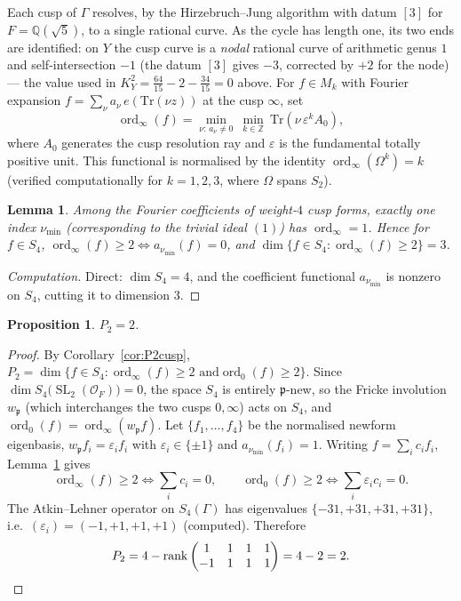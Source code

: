 \documentclass[11pt]{article}
\newtheorem{proposition}[theorem]{Proposition}
\newtheorem{lemma}[theorem]{Lemma}
\theoremstyle{definition}
\DeclareMathOperator{\ord}{ord}
\DeclareMathOperator{\rank}{rank}
\DeclareMathOperator{\SL}{SL}
\newcommand{\bQ}{\mathbb{Q}}
\newcommand{\bZ}{\mathbb{Z}}
\newcommand{\cO}{\mathcal{O}}
\newcommand{\fp}{\mathfrak{p}}
\newcommand{\Om}{\Omega}
\begin{document}
Each cusp of $\Gamma$ resolves, by the Hirzebruch--Jung algorithm with datum
$[3]$ for $F=\bQ(\sqrt5)$, to a single rational curve. As the cycle has length
one, its two ends are identified: on $Y$ the cusp curve is a \emph{nodal}
rational curve of arithmetic genus $1$ and self-intersection $-1$ (the datum
$[3]$ gives $-3$, corrected by $+2$ for the node) --- the value used in
$K_Y^2=\tfrac{64}{15}-2-\tfrac{34}{15}=0$ above.
For $f\in M_k$ with Fourier expansion $f=\sum_\nu a_\nu\,e(\mathrm{Tr}(\nu z))$
at the cusp $\infty$, set
\[
  \ord_\infty(f)=\min_{\nu:\,a_\nu\ne0}\ \min_{k\in\bZ}\ \mathrm{Tr}(\nu\,\varepsilon^k A_0),
\]
where $A_0$ generates the cusp resolution ray and $\varepsilon$ is the
fundamental totally positive unit. This functional is normalised by the
identity $\ord_\infty(\Om^k)=k$ (verified computationally for $k=1,2,3$, where
$\Om$ spans $S_2$).

\begin{lemma}\label{lem:dinf}
Among the Fourier coefficients of weight-$4$ cusp forms, exactly one index
$\nu_{\min}$ (corresponding to the trivial ideal $(1)$) has
$\ord_\infty=1$. Hence for $f\in S_4$,
$\ord_\infty(f)\ge2\iff a_{\nu_{\min}}(f)=0$, and
$\dim\{f\in S_4:\ord_\infty(f)\ge2\}=3$.
\end{lemma}

\begin{proof}[Computation]
Direct: $\dim S_4=4$, and the coefficient functional $a_{\nu_{\min}}$ is
nonzero on $S_4$, cutting it to dimension $3$.
\end{proof}

\begin{proposition}\label{prop:P2}
$P_2=2$.
\end{proposition}

\begin{proof}
By Corollary~\ref{cor:P2cusp}, $P_2=\dim\{f\in S_4:\ord_\infty(f)\ge2\text{ and
}\ord_0(f)\ge2\}$. Since $\dim S_4\bigl(\SL_2(\cO_F)\bigr)=0$, the space $S_4$
is entirely $\fp$-new, so the Fricke involution $w_\fp$ (which interchanges
the two cusps $0,\infty$) acts on $S_4$, and
$\ord_0(f)=\ord_\infty(w_\fp f)$. Let $\{f_1,\dots,f_4\}$ be the normalised
newform eigenbasis, $w_\fp f_i=\varepsilon_i f_i$ with $\varepsilon_i\in\{\pm1\}$
and $a_{\nu_{\min}}(f_i)=1$. Writing $f=\sum_i c_if_i$, Lemma~\ref{lem:dinf}
gives
\[
  \ord_\infty(f)\ge2\iff \textstyle\sum_i c_i=0,\qquad
  \ord_0(f)\ge2\iff \textstyle\sum_i \varepsilon_i c_i=0 .
\]
The Atkin--Lehner operator on $S_4(\Gamma)$ has eigenvalues
$\{-31,+31,+31,+31\}$, i.e.\ $(\varepsilon_i)=(-1,+1,+1,+1)$ (computed).
Therefore
\[
  P_2=4-\rank\begin{pmatrix}1&1&1&1\\ -1&1&1&1\end{pmatrix}=4-2=2 . \qedhere
\]
\end{proof}
\end{document}
